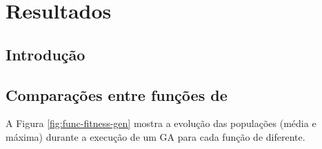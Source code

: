 \chapter{Resultados}
\label{cha:results}

\section{Introdução}


\section{Comparações entre funções de \fitness}

A Figura \ref{fig:func-fitness-gen} mostra a evolução das populações (\fitness média e máxima) durante a execução de um GA para cada função de \fitness diferente.


